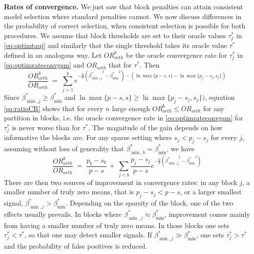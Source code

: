 \documentclass[bj,authoryear]{imsart}
\theoremstyle{plain}
\newcommand{\paul}[1]{{\small{\color{green} \sf $\spadesuit$ Paul: #1}}}
\begin{document}
\noindent\textbf{Rates of convergence.} We just saw that block penalties can attain consistent model selection where standard penalties cannot. We now discuss differences in the probability of correct selection, when consistent selection is possible for both procedures. We assume that block thresholds 
are set to their oracle values $\tau_j^*$ in \eqref{eq:optimtauj} 
and similarly that the single threshold
takes its oracle value $\tau^*$ defined in an analogous way.
Let ${OR}^b_{orth}$ be the oracle convergence rate for $\tau_j^*$ in \eqref{eq:optimrateconvgsm} and ${OR}_{orth}$ that for $\tau^*$.
Then
\begin{equation}\label{eq:ratioCR}
    \frac{{OR}^b_{orth}}{{OR}_{orth}}\;=\;\sum_{j=1}^be^{-\frac{n}{8}\left({\beta^*_{\min,j}}^2-{\beta_{\min}^*}^2\right)-(\ln \max\{p-s,s\}-\ln \max\{p_j-s_j,s_j\})}
\end{equation}
Since $\beta_{\min,j}^* \geq \beta_{\min}^*$ and $\ln \max\{p-s,s\}\geq\ln \max\{p_j-s_j,s_j\}\big)$, equation \eqref{eq:ratioCR} shows that for every $n$ large enough ${OR}^b_{orth} \leq {OR}_{orth}$ for any partition in blocks, i.e. the oracle convergence rate in \eqref{eq:optimrateconvgsm} for $\tau_j^*$ is never worse than for $\tau^*$. The magnitude of the gain depends on how informative the blocks are. %
For any sparse setting where $s_j<p_j-s_j$ for every $j$, assuming without loss of generality that $\beta_{\min,b}^*=\beta_{\min}^*$, we have
\begin{equation}\label{eq:goodorthratio}
    \frac{{OR}^b_{orth}}{{OR}_{orth}}\;=\; \frac{p_b-s_b}{p-s} \,+\,\sum_{j<b}\frac{p_j-s_j}{p-s}e^{-\frac{n}{8}\left({\beta^*_{\min,j}}^2-{\beta_{\min}^*}^2\right)}
\end{equation}
There are then two sources of improvement in convergence rates: in any block $j$, a smaller number of truly zero means, that is $p_j-s_j< p-s$, or a larger smallest signal, $\beta^*_{\min,j} > \beta_{\min}^*$. Depending on the sparsity of the block, one of the two effects usually prevails. In blocks where $\beta^*_{\min,j} \approx \beta_{\min}^*$, improvement comes mainly from having a smaller number of truly zero means. In those blocks
one sets $\tau^*_j < \tau^*$, so that one may detect smaller signals. 
If
$\beta^*_{\min,j} \gg \beta_{\min}^*$,
one sets $\tau^*_j > \tau^*$
and the probability of false positives is reduced.
\end{document}
